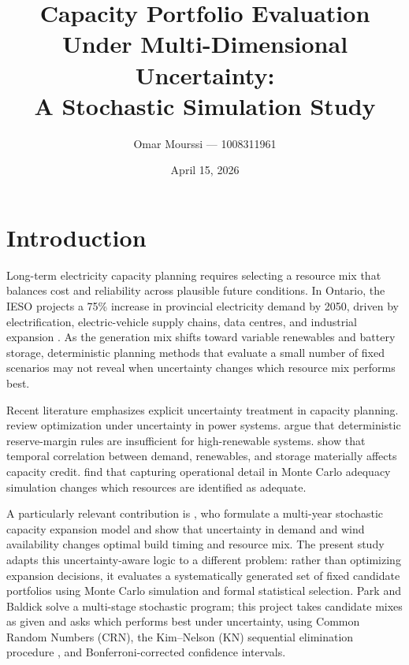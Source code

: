 \documentclass[11pt]{article}
\title{Capacity Portfolio Evaluation Under Multi-Dimensional Uncertainty:\\A Stochastic Simulation Study}
\author{Omar Mourssi --- 1008311961}
\date{April 15, 2026}
\begin{document}
\maketitle

\section{Introduction}\label{sec:intro}

Long-term electricity capacity planning requires selecting a resource mix that balances cost and reliability across plausible future conditions. In Ontario, the IESO projects a 75\% increase in provincial electricity demand by 2050, driven by electrification, electric-vehicle supply chains, data centres, and industrial expansion \citep{IESO2025}. As the generation mix shifts toward variable renewables and battery storage, deterministic planning methods that evaluate a small number of fixed scenarios may not reveal when uncertainty changes which resource mix performs best.

Recent literature emphasizes explicit uncertainty treatment in capacity planning. \citet{Roald2023} review optimization under uncertainty in power systems. \citet{Stover2023} argue that deterministic reserve-margin rules are insufficient for high-renewable systems. \citet{Wang2024} show that temporal correlation between demand, renewables, and storage materially affects capacity credit. \citet{Leibowicz2024} find that capturing operational detail in Monte Carlo adequacy simulation changes which resources are identified as adequate.

A particularly relevant contribution is \citet{ParkBaldick2016}, who formulate a multi-year stochastic capacity expansion model and show that uncertainty in demand and wind availability changes optimal build timing and resource mix. The present study adapts this uncertainty-aware logic to a different problem: rather than optimizing expansion decisions, it evaluates a systematically generated set of fixed candidate portfolios using Monte Carlo simulation and formal statistical selection. Park and Baldick solve a multi-stage stochastic program; this project takes candidate mixes as given and asks which performs best under uncertainty, using Common Random Numbers (CRN), the Kim--Nelson (KN) sequential elimination procedure \citep{KimNelson2001}, and Bonferroni-corrected confidence intervals.
\end{document}
